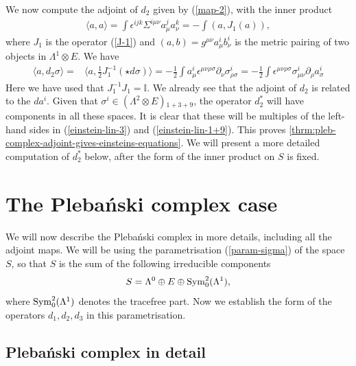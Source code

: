 \documentclass[10pt]{report}
\newcommand{\pleb}[0]{Pleba\'nski}
\theoremstyle{definition}
\begin{document}
We now compute the adjoint of $d_2$ given by (\ref{map-2}), with the inner product 
\begin{align}
\langle a,a\rangle = \int \epsilon^{ijk} \Sigma^{i\mu\nu} a_\mu^j a_\nu^k = - \int (a, J_1(a)),
\end{align}
where $J_1$ is the operator (\ref{J-1}) and $(a,b)=g^{\mu\nu} a_\mu^i b_\nu^i$ is the metric pairing of two objects in $\Lambda^1\otimes E$. We have
\begin{align}
\langle a, d_2 \sigma\rangle =& \langle a, \frac{1}{2} J_1^{-1} (\star d\sigma) \rangle= - \frac{1}{2} \int a_\mu^i \epsilon^{\mu\nu\rho\sigma} \partial_\nu \sigma^i_{\rho\sigma}
= -\frac{1}{2} \int \epsilon^{\mu\nu\rho\sigma} \sigma^i_{\mu\nu} \partial_\rho a_\sigma^i
\end{align}
Here we have used that $J_1^{-1} J_1=\mathbb{I}$. We already see that the adjoint of $d_2$ is related to the $da^i$. Given that $\sigma^i \in (\Lambda^2\otimes E){}_{1+3+9}$, the operator $d_2^*$ will have components in all these spaces. It is clear that these will be multiples of the left-hand sides in (\ref{einstein-lin-3}) and (\ref{einstein-lin-1+9}). This proves \cref{thrm:pleb-complex-adjoint-gives-einsteins-equations}. We will present a more detailed computation of $d_2^*$ below, after the form of the inner product on $S$ is fixed. 

\section{The \pleb{} complex case}

We will now describe the \pleb{} complex in more details, including all the adjoint maps. We will be using the parametrisation (\ref{param-sigma}) of the space $S$, so that $S$ is the sum of the following irreducible components
\begin{align}\label{S-spaces}
S = \Lambda^0 \oplus E \oplus {\rm Sym}_0^2(\Lambda^1),
\end{align}
where ${\rm Sym}_0^2(\Lambda^1)$ denotes the tracefree part. Now we establish the form of the operators $d_1, d_2, d_3$ in this parametrisation.

\subsection{\pleb{} complex in detail}
\end{document}
